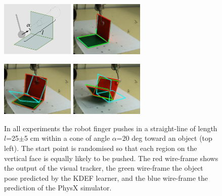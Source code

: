 \begin{figure}[t]
\centerline{
\includegraphics[width=3.5cm]{training}
\includegraphics[width=3.5cm]{complex1}
}
\centerline{
\includegraphics[width=3.5cm]{complex2}
\includegraphics[width=3.5cm]{complex4}
}
\caption[Setup]{In all experiments the robot finger pushes in a straight-line of length $l$=25$\pm$5 cm within a cone of angle $\alpha$=20 deg toward an object (top left). The start point is randomised so that each region on the vertical face is equally likely to be pushed. The red wire-frame shows the output of the visual tracker, the green wire-frame the object pose predicted by the KDEF learner, and the blue wire-frame the prediction of the PhysX simulator.}
\label{fig:Setup}
\end{figure}

